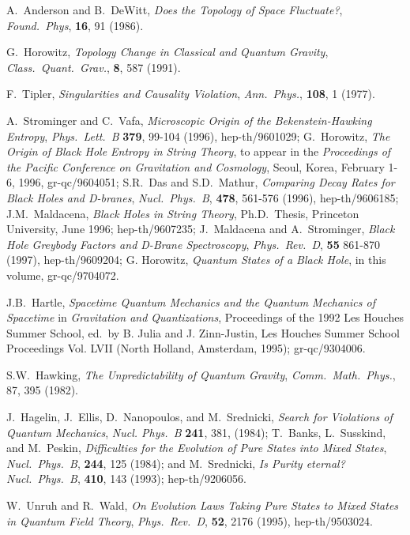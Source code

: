 \begin{references}
 A.~Anderson and B.~DeWitt, {\it Does the Topology of
Space Fluctuate?}, {\sl Found.~Phys}, {\bf 16}, 91
(1986).

 G.~Horowitz, {\it Topology Change in Classical and
Quantum
Gravity}, {\sl  Class.~Quant.~Grav.}, {\bf 8}, 587 (1991).

  F.~Tipler, {\it Singularities and Causality Violation}, {\sl Ann.~Phys.}, {\bf 108}, 1 (1977). 

  A.~Strominger and C.~Vafa, {\it Microscopic Origin of the
Bekenstein-Hawking Entropy}, {\sl Phys.~Lett.~B} {\bf 379},   99-104 (1996),
hep-th/9601029;
G.~Horowitz, {\it The Origin of Black Hole Entropy in String Theory}, to appear in the
{\sl Proceedings of the Pacific Conference on Gravitation and Cosmology},
Seoul, Korea, February 1-6, 1996, gr-qc/9604051; S.R.~Das and S.D.~Mathur, {\it Comparing
Decay Rates for
Black Holes and D-branes}, {\sl Nucl.~Phys.~B}, {\bf 478}, 561-576 (1996),
hep-th/9606185;
J.M.~Maldacena, {\sl Black Holes in String Theory},
Ph.D.~Thesis, Princeton University, June 1996;
hep-th/9607235; J.~Maldacena and A.~Strominger,  {\it Black Hole Greybody
Factors and D-Brane Spectroscopy}, {\sl Phys.~Rev.~D}, {\bf 55}  861-870 
(1997), hep-th/9609204; G. Horowitz, {\it Quantum States of a Black
Hole}, in this volume, gr-qc/9704072.


 J.B.~Hartle, {\it Spacetime Quantum Mechanics and the
Quantum Mechanics of Spacetime} in {\sl
Gravitation and Quantizations}, Proceedings of the 1992 Les Houches
Summer School, ed.~by B. Julia and J. Zinn-Justin, Les Houches Summer
School Proceedings Vol. LVII (North Holland, Amsterdam, 1995);
gr-qc/9304006.

 S.W.~Hawking, {\it The Unpredictability of Quantum
Gravity}, {\sl Comm.~Math.~Phys.},  87, 395
(1982).

 J.~Hagelin, J.~Ellis, D.~Nanopoulos, and M.~Srednicki, {\it
Search for Violations of Quantum Mechanics}, {\sl Nucl. Phys.~B} {\bf 241}, 381,
(1984);  T.~Banks, L.~Susskind, and M.~Peskin,
{\it Difficulties for the Evolution of Pure States into Mixed States},
{\sl Nucl.~Phys.~B},  {\bf 244}, 125 (1984); and 
M.~Srednicki, {\it Is Purity eternal?} 
{\sl Nucl.~Phys.~B}, {\bf 410}, 143 (1993);  hep-th/9206056.

 W.~Unruh and R.~Wald, {\it
 On Evolution Laws Taking Pure States to Mixed States in Quantum Field
Theory},
{\sl Phys.~Rev.~D}, {\bf 52},  2176 (1995), hep-th/9503024.


\end{references}
